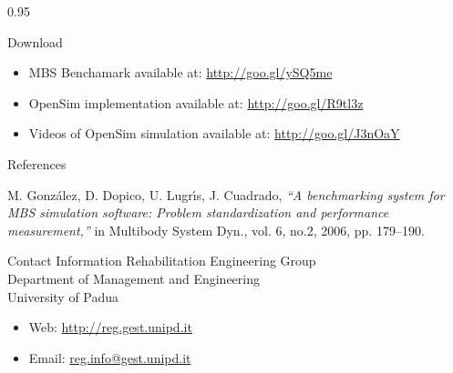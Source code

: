 \documentclass[final]{beamer}
\newlength{\onecolwid}
\newlength{\twocolwid}
\begin{document}
\begin{frame}[t]
\begin{columns}[t]
\begin{column}{\twocolwid}
\end{column}
\begin{column}{0.95\onecolwid} %

\begin{block}{Download}
\begin{itemize}
\item MBS Benchamark available at: \url{http://goo.gl/ySQ5me}
\item OpenSim implementation available at: \url{http://goo.gl/R9tl3z}
\item Videos of OpenSim simulation available at: \url{http://goo.gl/J3nOaY}
\end{itemize}
\end{block}

\begin{block}{References}

\begin{thebibliography}{99}

 M. Gonz{\'a}lez, D. Dopico, U. Lugr{\'\i}s, J. Cuadrado, \textit{``A benchmarking system for MBS simulation software: Problem standardization and performance measurement,''} 	in Multibody System Dyn., vol. 6, no.2,  2006, pp. 179--190.

\end{thebibliography}

\end{block}
\vspace{35cm}

\begin{alertblock}{Contact Information}
Rehabilitation Engineering Group\\Department of Management and Engineering\\ University of Padua

\begin{itemize}
\item Web: \href{http://reg.gest.unipd.it}{http://reg.gest.unipd.it}
\item Email: \href{mailto:reg.info@gest.unipd.it}{reg.info@gest.unipd.it}
\end{itemize}

\end{alertblock}


\end{column} %

\end{columns} %

\end{frame} %
\end{document}
